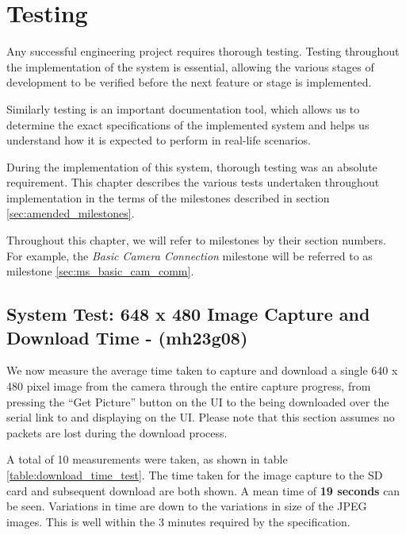 \chapter{Testing}
Any successful engineering project requires thorough testing. Testing throughout
the implementation of the system is essential, allowing the various stages of 
development to be verified before the next feature or stage is implemented.

Similarly testing is an important documentation tool, which allows us to determine the
exact specifications of the implemented system and helps us understand how it is 
expected to perform in real-life scenarios.

During the implementation of this system, thorough testing was an absolute
requirement. This chapter describes the various tests undertaken
throughout implementation in the terms of the milestones described in section
\ref{sec:amended_milestones}. 

Throughout this chapter, we will refer to milestones by their section numbers.
For example, the \emph{Basic Camera Connection} milestone will be referred
to as milestone \ref{sec:ms_basic_cam_comm}.







\section{System Test: 648 x 480 Image Capture and Download Time - (mh23g08)}

We now measure the average time taken to capture and download a single 640 x 480
pixel image from the camera through the entire capture progress, from pressing the 
``Get Picture'' button on the UI to the being downloaded over the serial link to and
displaying on the UI. Please note that this section assumes no packets are lost during
the download process.

A total of 10 measurements were taken, as shown in table \ref{table:download_time_test}.
The time taken for the image capture to the SD card and subsequent download are both
shown. A mean time of \textbf{19 seconds} can be seen. Variations in time are down to the
variations in size of the JPEG images. This is well within the 3 minutes required by the specification.

